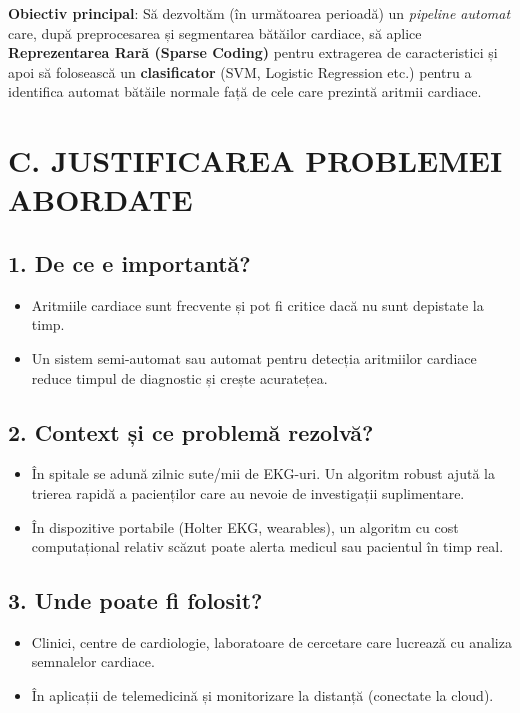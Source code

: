 \documentclass[12pt]{article}
\begin{document}
\textbf{Obiectiv principal}: Să dezvoltăm (în următoarea perioadă) un \emph{pipeline automat} care, după preprocesarea și segmentarea bătăilor cardiace, să aplice \textbf{Reprezentarea Rară (Sparse Coding)} pentru extragerea de caracteristici și apoi să folosească un \textbf{clasificator} (SVM, Logistic Regression etc.) pentru a identifica automat bătăile normale față de cele care prezintă aritmii cardiace.

\section{C. JUSTIFICAREA PROBLEMEI ABORDATE}

\subsection*{1. De ce e importantă?}
\begin{itemize}
    \item Aritmiile cardiace sunt frecvente și pot fi critice dacă nu sunt depistate la timp.
    \item Un sistem semi-automat sau automat pentru detecția aritmiilor cardiace reduce timpul de diagnostic și crește acuratețea.
\end{itemize}

\subsection*{2. Context și ce problemă rezolvă?}
\begin{itemize}
    \item În spitale se adună zilnic sute/mii de EKG-uri. Un algoritm robust ajută la trierea rapidă a pacienților care au nevoie de investigații suplimentare.
    \item În dispozitive portabile (Holter EKG, wearables), un algoritm cu cost computațional relativ scăzut poate alerta medicul sau pacientul în timp real.
\end{itemize}

\subsection*{3. Unde poate fi folosit?}
\begin{itemize}
    \item Clinici, centre de cardiologie, laboratoare de cercetare care lucrează cu analiza semnalelor cardiace.
    \item În aplicații de telemedicină și monitorizare la distanță (conectate la cloud).
\end{itemize}
\end{document}
